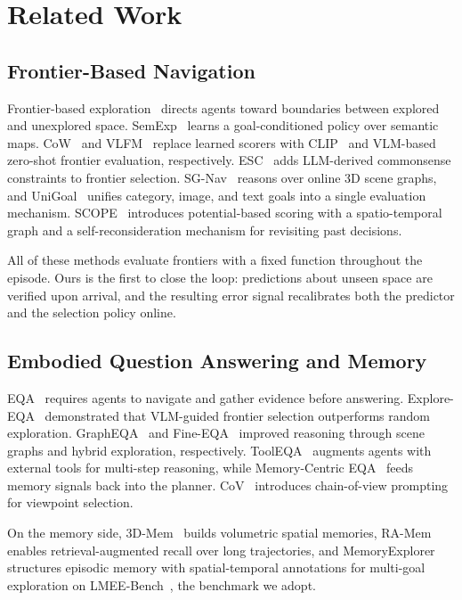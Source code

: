 \documentclass[10pt,twocolumn,letterpaper]{article}
\begin{document}
\section{Related Work}

\subsection{Frontier-Based Navigation}

Frontier-based exploration~\cite{yamauchi1997frontier} directs agents toward boundaries between explored and unexplored space. SemExp~\cite{chaplot2020semexp} learns a goal-conditioned policy over semantic maps. CoW~\cite{gadre2023cow} and VLFM~\cite{yokoyama2024vlfm} replace learned scorers with CLIP~\cite{radford2021clip} and VLM-based zero-shot frontier evaluation, respectively. ESC~\cite{zhou2023esc} adds LLM-derived commonsense constraints to frontier selection. SG-Nav~\cite{yin2024sgnav} reasons over online 3D scene graphs, and UniGoal~\cite{yin2025unigoal} unifies category, image, and text goals into a single evaluation mechanism. SCOPE~\cite{wang2026scope} introduces potential-based scoring with a spatio-temporal graph and a self-reconsideration mechanism for revisiting past decisions.

All of these methods evaluate frontiers with a fixed function throughout the episode. Ours is the first to close the loop: predictions about unseen space are verified upon arrival, and the resulting error signal recalibrates both the predictor and the selection policy online.

\subsection{Embodied Question Answering and Memory}

EQA~\cite{das2018eqa} requires agents to navigate and gather evidence before answering. Explore-EQA~\cite{ren2024exploreeqa} demonstrated that VLM-guided frontier selection outperforms random exploration. GraphEQA~\cite{saxena2025grapheqa} and Fine-EQA~\cite{jiang2025fineeqa} improved reasoning through scene graphs and hybrid exploration, respectively. ToolEQA~\cite{wang2025tooleqa} augments agents with external tools for multi-step reasoning, while Memory-Centric EQA~\cite{zhai2025memorycentric} feeds memory signals back into the planner. CoV~\cite{cov2026} introduces chain-of-view prompting for viewpoint selection.

On the memory side, 3D-Mem~\cite{huang20243dmem} builds volumetric spatial memories, RA-Mem~\cite{yang2024ramem} enables retrieval-augmented recall over long trajectories, and MemoryExplorer~\cite{wang2026memoryexplorer} structures episodic memory with spatial-temporal annotations for multi-goal exploration on LMEE-Bench~\cite{khanna2024goatbench}, the benchmark we adopt.
\end{document}
